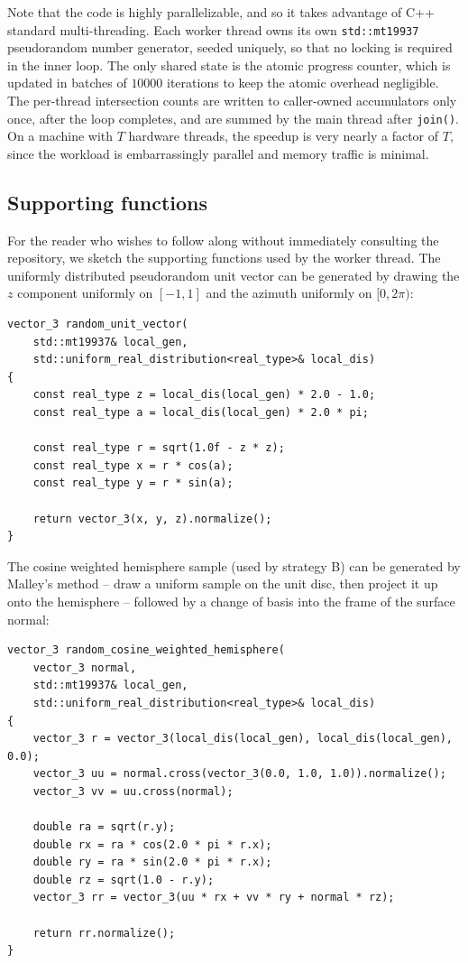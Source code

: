 \documentclass[10pt]{article}
\begin{document}
Note that the code is highly parallelizable, and so it takes advantage of C++ standard multi-threading.
Each worker thread owns its own \texttt{std::mt19937} pseudorandom number generator, seeded uniquely, so that no locking is required in the inner loop.
The only shared state is the atomic progress counter, which is updated in batches of $10000$ iterations to keep the atomic overhead negligible.
The per-thread intersection counts are written to caller-owned accumulators only once, after the loop completes, and are summed by the main thread after \texttt{join()}.
On a machine with $T$ hardware threads, the speedup is very nearly a factor of $T$, since the workload is embarrassingly parallel and memory traffic is minimal.

\subsection{Supporting functions}

For the reader who wishes to follow along without immediately consulting the repository, we sketch the supporting functions used by the worker thread.
The uniformly distributed pseudorandom unit vector can be generated by drawing the $z$ component uniformly on $[-1, 1]$ and the azimuth uniformly on $[0, 2\pi)$:

\begin{lstlisting}
vector_3 random_unit_vector(
	std::mt19937& local_gen, 
	std::uniform_real_distribution<real_type>& local_dis)
{
	const real_type z = local_dis(local_gen) * 2.0 - 1.0;
	const real_type a = local_dis(local_gen) * 2.0 * pi;

	const real_type r = sqrt(1.0f - z * z);
	const real_type x = r * cos(a);
	const real_type y = r * sin(a);

	return vector_3(x, y, z).normalize();
}
\end{lstlisting}

The cosine weighted hemisphere sample (used by strategy B) can be generated by Malley's method -- draw a uniform sample on the unit disc, then project it up onto the hemisphere -- followed by a change of basis into the frame of the surface normal:

\begin{lstlisting}
vector_3 random_cosine_weighted_hemisphere(
	vector_3 normal,
	std::mt19937& local_gen, 
	std::uniform_real_distribution<real_type>& local_dis)
{
	vector_3 r = vector_3(local_dis(local_gen), local_dis(local_gen), 0.0);
	vector_3 uu = normal.cross(vector_3(0.0, 1.0, 1.0)).normalize();
	vector_3 vv = uu.cross(normal);

	double ra = sqrt(r.y);
	double rx = ra * cos(2.0 * pi * r.x);
	double ry = ra * sin(2.0 * pi * r.x);
	double rz = sqrt(1.0 - r.y);
	vector_3 rr = vector_3(uu * rx + vv * ry + normal * rz);

	return rr.normalize();
}
\end{lstlisting}
\end{document}
